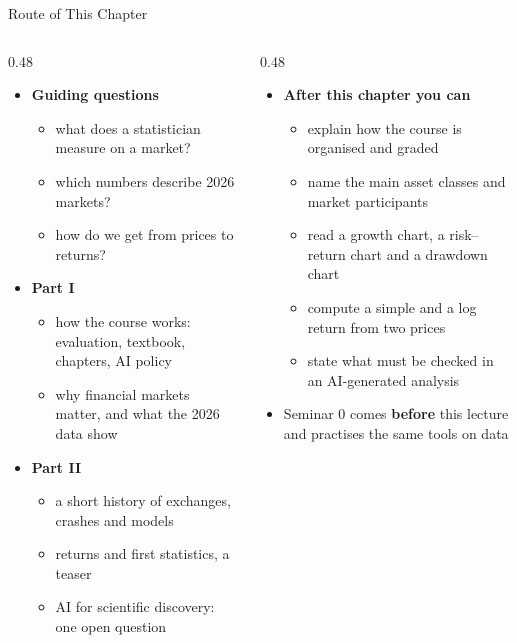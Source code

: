 \begin{frame}{Route of This Chapter}
\itemsize{\small}
\begin{columns}[T]
\begin{column}{0.48\textwidth}
\begin{itemize}
    \item \textbf{Guiding questions}
    \begin{itemize}
        \item what does a statistician measure on a market?
        \item which numbers describe 2026 markets?
        \item how do we get from prices to returns?
    \end{itemize}
    \item \textbf{Part I}
    \begin{itemize}
        \item how the course works: evaluation, textbook, chapters, AI policy
        \item why financial markets matter, and what the 2026 data show
    \end{itemize}
    \item \textbf{Part II}
    \begin{itemize}
        \item a short history of exchanges, crashes and models
        \item returns and first statistics, a teaser
        \item AI for scientific discovery: one open question
    \end{itemize}
\end{itemize}
\end{column}
\begin{column}{0.48\textwidth}
\begin{itemize}
    \item \textbf{After this chapter you can}
    \begin{itemize}
        \item explain how the course is organised and graded
        \item name the main asset classes and market participants
        \item read a growth chart, a risk--return chart and a drawdown chart
        \item compute a simple and a log return from two prices
        \item state what must be checked in an AI-generated analysis
    \end{itemize}
    \item Seminar 0 comes \textbf{before} this lecture and practises the same tools on data
\end{itemize}
\end{column}
\end{columns}
\end{frame}

